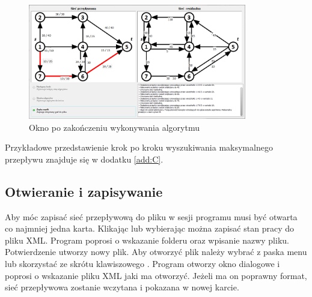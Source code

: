 \begin{figure}[H]
	\centering
	\includegraphics[width=0.85\textwidth]{./img/spec_zew06_5}
	\caption{Okno po zakończeniu wykonywania algorytmu}
	\label{fig:algorithmWindowFinished}
\end{figure}
Przykładowe przedstawienie krok po kroku wyszukiwania maksymalnego przepływu znajduje się w dodatku \ref{add:C}.
\subsection{Otwieranie i zapisywanie}
Aby móc zapisać sieć przepływową do pliku w sesji programu musi być otwarta co najmniej jedna karta. Klikając  lub wybierając  można zapisać stan pracy do pliku XML. Program poprosi o wskazanie folderu oraz wpisanie nazwy pliku. Potwierdzenie utworzy nowy plik.
Aby otworzyć plik należy wybrać z paska menu  lub skorzystać ze skrótu klawiszowego . Program otworzy okno dialogowe i poprosi o wskazanie pliku XML jaki ma otworzyć. Jeżeli ma on poprawny format, sieć przepływowa zostanie wczytana i pokazana w nowej karcie.